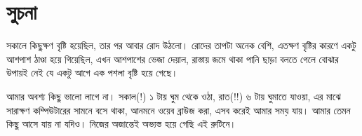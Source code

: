 \section{সুচনা}
সকালে কিছুক্ষণ বৃষ্টি হয়েছিল, তার পর আবার রোদ উঠলো। রোদের তাপটা অনেক বেশি, এতক্ষণ বৃষ্টির কারণে একটু আশপাশ ঠাণ্ডা হয়ে গিয়েছিল, এখন আশপাশের ভেজা দেয়াল, রাস্তায় জমে থাকা পানি ছাড়া বলতে গেলে বোঝার উপায়ই নেই যে একটু আগে এক পশলা বৃষ্টি হয়ে গেছে।

আমার অবশ্য কিছু ভালো লাগে না।  সকাল(!) ১ টায় ঘুম থেকে ওঠা, রাত(!!) ৬ টায় ঘুমাতে যাওয়া, এর মাঝে
সারাক্ষণ কম্পিউটারের সামনে বসে থাকা, আনমনে ওয়েব ব্রাউজ করা, এসব করেই আমার সময় যায়। আমার তেমন কিছু আসে যায় না যদিও। নিজের অজান্তেই অভ্যস্ত হয়ে গেছি এই রুটিনে।


